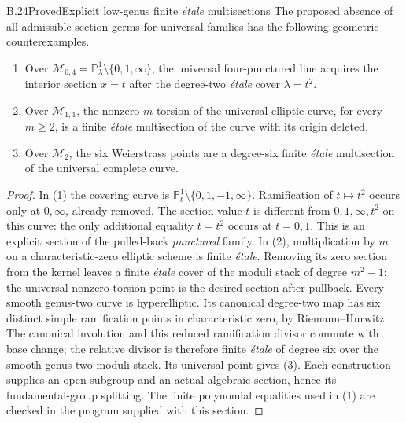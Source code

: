 \begin{statement}{B.24}{Proved}{Explicit low-genus finite \emph{\'etale} multisections}
The proposed absence of all admissible section germs for universal
families has the following geometric counterexamples.
\begin{enumerate}
\item Over $\mathcal M_{0,4}=\mathbb P^1_\lambda\setminus\{0,1,\infty\}$,
the universal four-punctured line acquires the interior section
$x=t$ after the degree-two \emph{\'etale} cover $\lambda=t^2$.
\item Over $\mathcal M_{1,1}$, the nonzero $m$-torsion of the universal
elliptic curve, for every $m\geq2$, is a finite \emph{\'etale}
multisection of the curve with its origin deleted.
\item Over $\mathcal M_2$, the six Weierstrass points are a degree-six
finite \emph{\'etale} multisection of the universal complete curve.
\end{enumerate}
\end{statement}
\begin{proof}
In (1) the covering curve is
$\mathbb P^1_t\setminus\{0,1,-1,\infty\}$.
Ramification of $t\mapsto t^2$ occurs only at $0,\infty$, already
removed.  The section value $t$ is different from $0,1,\infty,t^2$
on this curve: the only additional equality $t=t^2$ occurs at
$t=0,1$.  This is an explicit section of the pulled-back
\emph{punctured} family.
In (2), multiplication by $m$ on a characteristic-zero elliptic
scheme is finite \emph{\'etale}.  Removing its zero section from the
kernel leaves a finite \emph{\'etale} cover of the moduli stack of
degree $m^2-1$; the universal nonzero torsion point is the desired
section after pullback.
Every smooth genus-two curve is hyperelliptic.  Its canonical
degree-two map has six distinct simple ramification points in
characteristic zero, by Riemann--Hurwitz.  The canonical involution
and this reduced ramification divisor commute with base change;
the relative divisor is therefore finite \emph{\'etale} of degree
six over the smooth genus-two moduli stack.  Its universal point
gives (3).  Each construction supplies an open subgroup and an
actual algebraic section, hence its fundamental-group splitting.
The finite polynomial equalities used in (1) are checked in the
program supplied with this section.
\end{proof}

